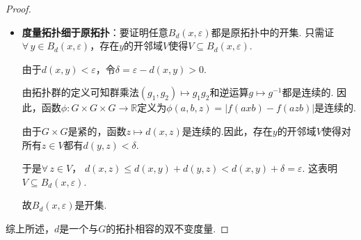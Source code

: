 \documentclass[lang=cn,a4paper,11pt,openany,scheme=chinese]{elegantbook}
\renewcommand{\leq}{\leqslant}
\begin{document}
\begin{proof}
\begin{itemize}
\begin{itemize}
            另一方面，$d(x,y_{n_k})<\frac{1}{n_k}\to 0$，且函数$z\mapsto d(x,z)$连续，故$d(x,y)=\lim_{k\to\infty} d(x,y_{n_k})=0$.\par
            由度量的正定性，$x=y$，这与$y\neq x$矛盾. 故原拓扑比度量拓扑更细.
            \item \textbf{度量拓扑细于原拓扑}：要证明任意$B_d(x,\varepsilon)$都是原拓扑中的开集.
            只需证$\forall\, y\in B_d(x,\varepsilon)$，存在$y$的开邻域$V$使得$V\subseteq B_d(x,\varepsilon)$.\par
            由于$d(x,y)<\varepsilon$，令$\delta=\varepsilon-d(x,y)>0$.\par
            由拓扑群的定义可知群乘法$(g_1,g_2)\mapsto g_1g_2$和逆运算$g\mapsto g^{-1}$都是连续的.
            因此，函数$\phi:G\times G\times G\to \mathbb{R}$定义为$\phi(a,b,z)=|f(axb)-f(azb)|$是连续的.\par
            由于$G\times G$是紧的，函数$z\mapsto d(x,z)$是连续的.因此，存在$y$的开邻域$V$使得对所有$z\in V$都有$d(y,z)<\delta$.\par
            于是$\forall\, z\in V$， $d(x,z)\leq d(x,y)+d(y,z) < d(x,y)+\delta = \varepsilon$.
            这表明$V\subseteq B_d(x,\varepsilon)$.\par
            故$B_d(x,\varepsilon)$是开集.
        \end{itemize}
    \end{itemize}
    综上所述，$d$是一个与$G$的拓扑相容的双不变度量.
\end{proof}
\end{document}
